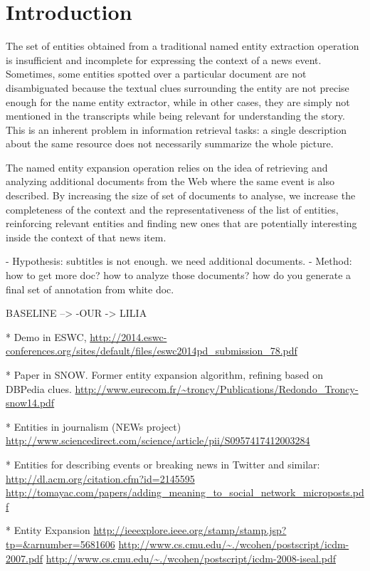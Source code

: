 \documentclass{llncs}
\begin{document}
\section{Introduction}


The set of entities obtained from a traditional named entity extraction operation is insufficient and incomplete for expressing the context of a news event. Sometimes, some entities spotted over a particular document are not disambiguated because the textual clues surrounding the entity are not precise enough for the name entity extractor, while in other cases, they are simply not mentioned in the transcripts while being relevant for understanding the story. This is an inherent problem in information retrieval tasks: a single description about the same resource does not necessarily summarize the whole picture.

The named entity expansion operation relies on the idea of retrieving and analyzing additional documents from the Web where the same event is also described. By increasing the size of set of documents to analyse, we increase the completeness of the context and the representativeness of the list of entities, reinforcing relevant entities and finding new ones that are potentially interesting inside the context of that news item.

- Hypothesis: subtitles is not enough. we need additional documents.
- Method:  how to get more doc?
		how to analyze those documents?
		how do you generate a final set of annotation from white doc.
		
		
BASELINE --> -OUR -> LILIA


* Demo in ESWC, 
\url{http://2014.eswc-conferences.org/sites/default/files/eswc2014pd_submission_78.pdf}

* Paper in SNOW. Former entity expansion algorithm, refining based on DBPedia clues.
\url{http://www.eurecom.fr/~troncy/Publications/Redondo_Troncy-snow14.pdf}

* Entities in journalism (NEWs project)
\url{http://www.sciencedirect.com/science/article/pii/S0957417412003284}

* Entities for describing events or breaking news in Twitter and similar:
\url{http://dl.acm.org/citation.cfm?id=2145595}
\url{http://tomayac.com/papers/adding_meaning_to_social_network_microposts.pdf}

* Entity Expansion 
\url{http://ieeexplore.ieee.org/stamp/stamp.jsp?tp=&arnumber=5681606}
\url{http://www.cs.cmu.edu/~./wcohen/postscript/icdm-2007.pdf}
\url{http://www.cs.cmu.edu/~./wcohen/postscript/icdm-2008-iseal.pdf}
\end{document}
